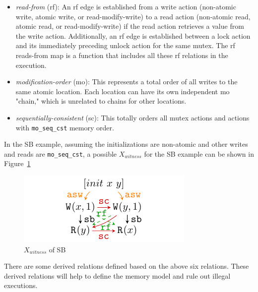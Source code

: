 \begin{itemize}
	\item \textit{read-from} (rf): An rf edge is established from a write action (non-atomic write, atomic write, or read-modify-write) to a read action (non-atomic read, atomic read, or read-modify-write) if the read action retrieves a value from the write action. Additionally, an rf edge is established between a lock action and its immediately preceding unlock action for the same mutex. The rf reads-from map is a function that includes all these rf relations in the execution.
	\item \textit{modification-order} (mo): This represents a total order of all writes to the same atomic location. Each location can have its own independent mo "chain," which is unrelated to chains for other locations.
	\item \textit{sequentially-consistent} (sc): This totally orders all mutex actions and actions with \texttt{mo\_seq\_cst} memory order.
\end{itemize}


In the SB example, assuming the initializations are non-atomic and other writes and reads are \texttt{mo\_seq\_cst}, a possible $X_{witness}$ for the SB example can be shown in Figure~\ref{XwitnessSB}

\begin{figure}[htbp] %
	\centering
	\includegraphics[scale=1]{figure/exec-graph/SB2.pdf} %
	\caption{$X_{witness}$ of SB} %
	\label{XwitnessSB} %
\end{figure}

There are some derived relations defined based on the above six relations. These derived relations will help to define the memory model and rule out illegal executions.

